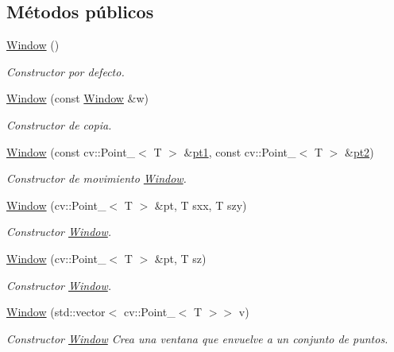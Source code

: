 \subsection*{Métodos públicos}
\begin{DoxyCompactItemize}
\item 
\hyperlink{group___geometric_entities_ga2d226aaf94cc5ed88652f78ef8403820}{Window} ()
\begin{DoxyCompactList}\small\item\em Constructor por defecto. \end{DoxyCompactList}\item 
\hyperlink{group___geometric_entities_ga029382701e212fdcae3b72350bb7d9cb}{Window} (const \hyperlink{class_i3_d_1_1_window}{Window} \&w)
\begin{DoxyCompactList}\small\item\em Constructor de copia. \end{DoxyCompactList}\item 
\hyperlink{group___geometric_entities_gaad67f178a66be3d3555c75c9999f2403}{Window} (const cv\+::\+Point\+\_\+$<$ T $>$ \&\hyperlink{class_i3_d_1_1_window_a067d3a7971d68c3920cfca5a4b5358c1}{pt1}, const cv\+::\+Point\+\_\+$<$ T $>$ \&\hyperlink{class_i3_d_1_1_window_ad4d4d2689f3ccd2e695506dcb55e1d44}{pt2})
\begin{DoxyCompactList}\small\item\em Constructor de movimiento \hyperlink{class_i3_d_1_1_window}{Window}. \end{DoxyCompactList}\item 
\hyperlink{group___geometric_entities_ga15c278087e96c6d37db30cd667a17591}{Window} (cv\+::\+Point\+\_\+$<$ T $>$ \&pt, T sxx, T szy)
\begin{DoxyCompactList}\small\item\em Constructor \hyperlink{class_i3_d_1_1_window}{Window}. \end{DoxyCompactList}\item 
\hyperlink{group___geometric_entities_gaa4c7acb8b82826e6fef1d9aeb00e6d2e}{Window} (cv\+::\+Point\+\_\+$<$ T $>$ \&pt, T sz)
\begin{DoxyCompactList}\small\item\em Constructor \hyperlink{class_i3_d_1_1_window}{Window}. \end{DoxyCompactList}\item 
\hyperlink{group___geometric_entities_gad423e12e78a18a2c6bcd65172d2808b7}{Window} (std\+::vector$<$ cv\+::\+Point\+\_\+$<$ T $>$$>$ v)
\begin{DoxyCompactList}\small\item\em Constructor \hyperlink{class_i3_d_1_1_window}{Window} Crea una ventana que envuelve a un conjunto de puntos. \end{DoxyCompactList}\item 
$$
\end{DoxyCompactItemize}
